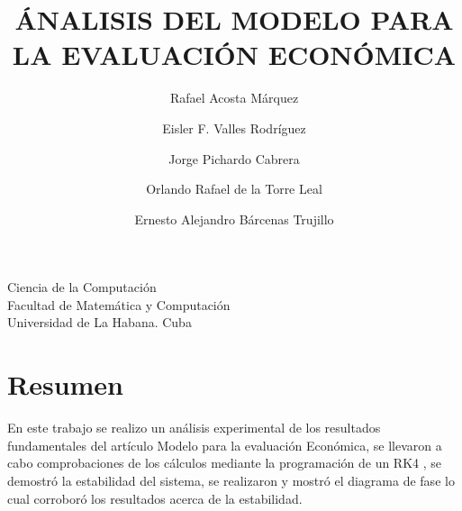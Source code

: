 \documentclass{wscpaperproc}
\theoremstyle{wsc}
\begin{document}
%
%

\title{\'ANALISIS DEL MODELO PARA LA EVALUACI\'ON ECON\'OMICA}
Ciencia de la Computaci\'on\\
	Facultad de Matem\'atica y Computaci\'on\\
	Universidad de La Habana. Cuba\\
\author{Rafael Acosta M\'arquez\\[12pt]
	
\and
Eisler F. Valles Rodr\'iguez\\[12pt]
\and
Jorge Pichardo Cabrera\\[12pt]
\and
Orlando Rafael de la Torre Leal\\[12pt]
\and
Ernesto Alejandro B\'arcenas Trujillo\\[12pt]

}


  

\maketitle
\newpage

\section*{Resumen}
En este trabajo se realizo un an\'alisis experimental de los resultados fundamentales
del art\'iculo Modelo para la evaluaci\'on Econ\'omica, se llevaron a cabo comprobaciones 
de los c\'alculos mediante la programaci\'on de un RK4 , se demostr\'o la estabilidad del sistema, se realizaron y mostr\'o el diagrama de fase lo cual corrobor\'o los resultados acerca de la estabilidad.\\
\end{document}

